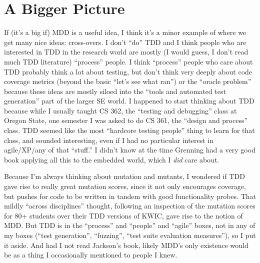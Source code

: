 \documentclass[sigplan,screen]{acmart}
\begin{document}
\section{A Bigger Picture}

If (it's a big if) MDD is a useful idea, I think it's a minor example
of where we get many nice ideas:  cross-overs.  I don't ``do'' TDD and
I think people who are interested in TDD in the research world are
mostly (I would guess, I don't read much TDD literature) ``process''
people.  I think ``process'' people who care about TDD probably think
a lot about testing, but don't think very deeply about code coverage
metrics (beyond the basic ``let's see what ran'') or the ``oracle
problem''~\cite{staats2011programs,oracleMcMinn} because these ideas are mostly siloed into the ``tools and
automated test generation'' part of the larger SE world.  I happened
to start thinking about TDD because while I usually taught CS 362, the
``testing and debugging'' class at Oregon State, one semester I was
asked to do CS 361, the ``design and process'' class.  TDD seemed like
the most ``hardcore testing people'' thing to learn for that class,
and sounded interesting, even if I had no particular interest in
agile/XP/any of that ``stuff.''  I didn't know at the time Grenning
had a very good book applying all this to the embedded world, which I
\emph{did} care about.

Because I'm always thinking about mutation and mutants, I wondered if
TDD gave rise to really great mutation scores, since it not only
encourages coverage, but pushes for code to be written in tandem with
good functionality probes.  That mildly ``across disciplines''
thought, following an inspection of the mutation scores for 80+
students over their TDD versions of KWIC,
gave rise to the notion of MDD.  But TDD is in the ``process'' and
``people'' and ``agile'' boxes, not in any of my boxes (``test
generation'', ``fuzzing'', ``test suite evaluation measures''), so I
put it aside.  And had I not read Jackson's book, likely MDD's only
existence would be as a thing I occasionally mentioned to people I knew.
\end{document}
